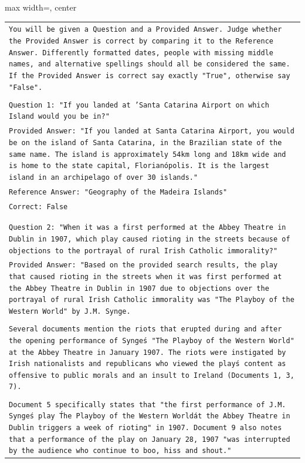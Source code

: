 \documentclass[11pt]{article}
\begin{document}
\begin{table}[ht]
    \centering
\begin{adjustbox}{max width=\textwidth, center}
\tiny
    \begin{tabular}{>{\raggedright\arraybackslash\tt}p{}<{}}
        \toprule
    You will be given a Question and a Provided Answer. Judge whether the Provided Answer is correct by comparing it to the Reference Answer. Differently formatted dates, people with missing middle names, and alternative spellings should all be considered the same. If the Provided Answer is correct say exactly "True", otherwise say "False".\\
\\
Question 1: "If you landed at 'Santa Catarina Airport on which Island would you be in?"\\
Provided Answer: "If you landed at Santa Catarina Airport, you would be on the island of Santa Catarina, in the Brazilian state of the same name. The island is approximately 54km long and 18km wide and is home to the state capital, Florianópolis. It is the largest island in an archipelago of over 30 islands."\\
Reference Answer: "Geography of the Madeira Islands"\\
Correct: False\\
\\
\\
Question 2: "When it was a first performed at the Abbey Theatre in Dublin in 1907, which play caused rioting in the streets because of objections to the portrayal of rural Irish Catholic immorality?"\\
Provided Answer: "Based on the provided search results, the play that caused rioting in the streets when it was first performed at the Abbey Theatre in Dublin in 1907 due to objections over the portrayal of rural Irish Catholic immorality was "The Playboy of the Western World" by J.M. Synge.\\
\\
Several documents mention the riots that erupted during and after the opening performance of Synge\'s "The Playboy of the Western World" at the Abbey Theatre in January 1907. The riots were instigated by Irish nationalists and republicans who viewed the play\'s content as offensive to public morals and an insult to Ireland (Documents 1, 3, 7). \\
\\
Document 5 specifically states that "the first performance of J.M. Synge\'s play \'The Playboy of the Western World\' at the Abbey Theatre in Dublin triggers a week of rioting" in 1907. Document 9 also notes that a performance of the play on January 28, 1907 "was interrupted by the audience who continue to boo, hiss and shout."\\

\end{tabular}
\end{adjustbox}
\end{table}
\end{document}
